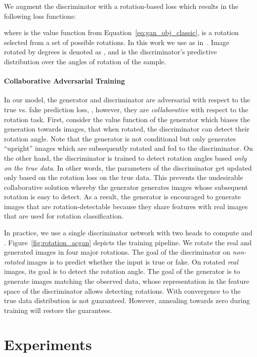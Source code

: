 \documentclass[10pt,twocolumn,letterpaper]{article}
\begin{document}
We augment the discriminator with a rotation-based loss which results in the following loss functions:

where  is the value function from Equation~\ref{eq:gan_obj_classic},
 is a rotation selected from a set of possible rotations.
In this work we use 
as in~\citet{gidaris2018unsupervised}. Image  rotated by  degrees is denoted as , and  is the discriminator's predictive distribution over the angles of rotation of the sample.

\paragraph{Collaborative Adversarial Training}
In our model, the generator and discriminator are adversarial with respect to the true vs. fake prediction loss, , however, they are \emph{collaborative} with respect to the rotation task.
First, consider the value function of the generator which biases the generation towards images, that when rotated, the discriminator can detect their rotation angle. Note that the generator is not conditional but only generates ``upright'' images which are subsequently rotated and fed to the discriminator. On the other hand, the discriminator is trained to detect rotation angles based \emph{only on the true data}. In other words, the parameters of the discriminator get updated only based on the rotation loss on the true data. This prevents the undesirable collaborative solution whereby the generator generates images whose subsequent rotation is easy to detect. As a result, the generator is encouraged to generate images that are rotation-detectable because they share features with real images that are used for rotation classification.

In practice, we use a single discriminator network with two heads to compute  and . Figure~\ref{fig:rotation_acgan} depicts the training pipeline. We rotate the real and generated images in four major rotations. The goal of the discriminator on \textit{non-rotated} images is to predict whether the input is true or fake. On rotated \emph{real} images, its goal is to detect the rotation angle. The goal of the generator is to generate images matching the observed data, whose representation in the feature space of the discriminator allows detecting rotations. With  convergence to the true data distribution  is not guaranteed. However, annealing  towards zero during training will restore the guarantees.
 \section{Experiments}
\label{sec:experiments}
\end{document}
